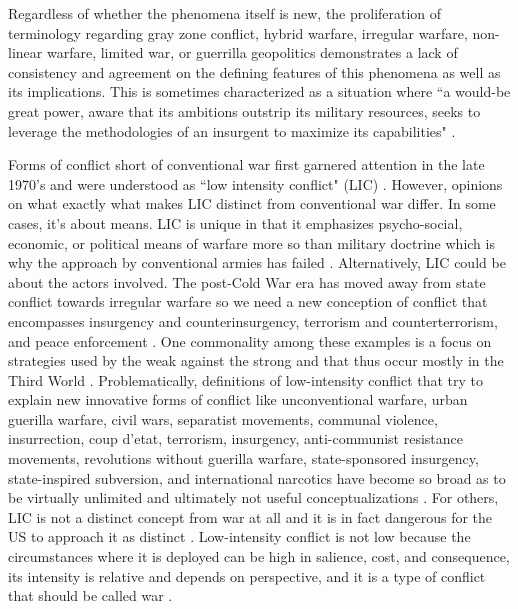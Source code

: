 \documentclass[12pt,letterpaper]{article}
\begin{document}
		Regardless of whether the phenomena itself is new, the proliferation of terminology regarding gray zone conflict, hybrid warfare, irregular warfare, non-linear warfare, limited war, or guerrilla geopolitics demonstrates a lack of consistency and agreement on the defining features of this phenomena as well as its implications. This is sometimes characterized as a situation where ``a would-be great power, aware that its ambitions outstrip its military resources, seeks to leverage the methodologies of an insurgent to maximize its capabilities" \citep{galeotti_hybridambiguousnonlinear_2016}.
		
		Forms of conflict short of conventional war first garnered attention in the late 1970's and were understood as ``low intensity conflict" (LIC) \citep{schultz_lowintensitywarfarechallenge_1986}. However, opinions on what exactly what makes LIC distinct from conventional war differ. In some cases, it's about means. LIC is unique in that it emphasizes psycho-social, economic, or political means of warfare more so than military doctrine which is why the approach by conventional armies has failed \citep{adams_liclowintensity_1990, kornbluh_lowintensityconflictit_1986}. Alternatively, LIC could be about the actors involved. The post-Cold War era has moved away from state conflict towards irregular warfare so we need a new conception of conflict that encompasses insurgency and counterinsurgency, terrorism and counterterrorism, and peace enforcement  \citep{downie_lowintensityconflict_1992, kinross_clausewitzlowintensityconflict_2004}. One commonality among these examples is a focus on strategies used by the weak against the strong and that thus occur mostly in the Third World  \citep{kornbluh_lowintensityconflictit_1986, kober_lowintensityconflictswhy_2002, hammond_lowintensityconflict_1990}. Problematically, definitions of low-intensity conflict that try to explain new innovative forms of conflict like unconventional warfare, urban guerilla warfare, civil wars, separatist movements, communal violence, insurrection, coup d'etat, terrorism, insurgency, anti-communist resistance movements, revolutions without guerilla warfare, state-sponsored insurgency, state-inspired subversion, and international narcotics have become so broad as to be virtually unlimited and ultimately not useful conceptualizations \citep{schultz_lowintensitywarfarechallenge_1986, hammond_lowintensityconflict_1990}. For others, LIC is not a distinct concept from war at all and it is in fact dangerous for the US to approach it as distinct \citep{hammond_lowintensityconflict_1990, kober_lowintensityconflictswhy_2002}. Low-intensity conflict is not low because the circumstances where it is deployed can be high in salience, cost, and consequence, its intensity is relative and depends on perspective, and it is a type of conflict that should be called war \citep{kinross_clausewitzlowintensityconflict_2004}.
		
\end{document}
